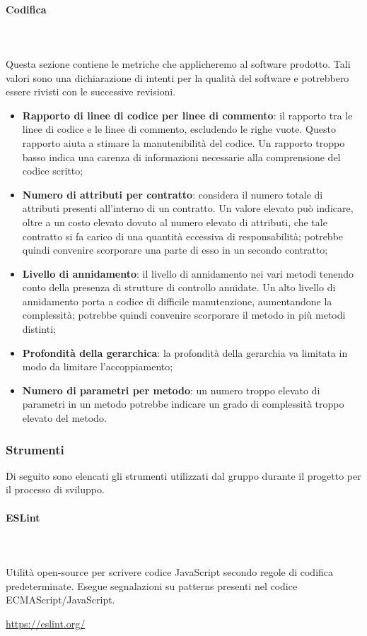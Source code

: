 \paragraph{Codifica} \mbox{}\\ \mbox{}\\
Questa sezione contiene le metriche che applicheremo al software prodotto. Tali  valori  sono  una  dichiarazione  di  intenti  per  la qualità del software e potrebbero essere rivisti con le successive revisioni.
	\begin{itemize}
		\item \textbf{Rapporto di linee di codice per linee di commento}: il rapporto tra le linee di codice e le linee di commento, escludendo le righe vuote.  Questo rapporto aiuta a stimare la manutenibilità del codice.  Un rapporto troppo basso indica una carenza di informazioni	necessarie alla comprensione del codice scritto;
		\item \textbf{Numero di attributi per contratto}: considera il numero totale di attributi presenti all'interno di un contratto. Un valore elevato può indicare, oltre a un costo elevato dovuto al numero elevato di attributi, che tale contratto si fa carico di una quantità eccessiva di responsabilità; potrebbe quindi convenire scorporare una parte di esso in un secondo contratto;
		\item \textbf{Livello di annidamento}: il livello di annidamento nei vari metodi tenendo	conto della presenza di strutture di controllo annidate.  Un alto livello di annidamento porta a codice di difficile manutenzione, aumentandone la complessità; potrebbe quindi convenire scorporare il metodo in più metodi distinti;
		\item \textbf{Profondità della gerarchica}: la profondità della gerarchia va limitata in modo da limitare l’accoppiamento;
		\item \textbf{Numero di parametri per metodo}: un numero troppo elevato di parametri in un metodo potrebbe indicare un grado di complessità troppo elevato del metodo.
	\end{itemize}

\subsubsection{Strumenti}
Di seguito sono elencati gli strumenti utilizzati dal gruppo durante il 
progetto per il processo di sviluppo.
		
\paragraph{ESLint} \mbox{}\\ \mbox{}\\
Utilità open-source per scrivere codice JavaScript secondo regole di codifica 
predeterminate. Esegue segnalazioni su patterns presenti nel codice 
ECMAScript/JavaScript.\\
\centerline{\url{https://eslint.org/}}
		

